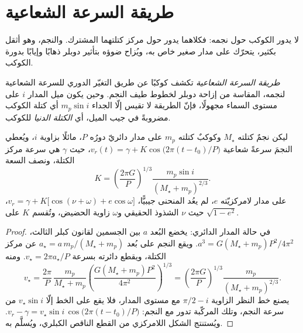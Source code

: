 \section{طريقة السرعة الشعاعية}\label{sec:b3:exoplanets:rv}

لا يدور الكوكب حول نجمه: فكلاهما يدور حول مركز كتلتهما المشترك.
والنجم، وهو أثقل بكثير، يتحرّك على مدار صغير خاص به، ويُزاح ضوؤه
بتأثير دوبلر ذهابًا وإيابًا بدورة الكوكب.

\begin{definition}\label{def:b3:exoplanets:rv}
\emph{طريقة السرعة الشعاعية} تكشف كوكبًا
عن طريق التغيّر الدوري للسرعة الشعاعية لنجمه،
المقاسة من إزاحة دوبلر لخطوط طيف النجم. وحين
يكون ميل المدار $i$ على مستوى السماء مجهولًا، فإنّ الطريقة
لا تقيس إلّا الجداء $m_p\sin i$ أي كتلة الكوكب مضروبةً في جيب
الميل، أي \emph{الكتلة الدنيا}
للكوكب.
\end{definition}

\begin{theorem}\label{thm:b3:exoplanets:semi-amplitude}
ليكن نجمٌ كتلته $M_\star$ وكوكبٌ كتلته $m_p$ على مدار دائريّ
دورُه $P$، مائلًا بزاوية $i$، ويُعطي النجمَ سرعةً شعاعية
$v_r(t) = \gamma + K\cos\bigl(2\pi(t - t_0)/P\bigr)$، حيث $\gamma$ هي
سرعة مركز الكتلة، ونصف السعة
\[
K = \left(\frac{2\pi G}{P}\right)^{1/3}
    \frac{m_p\sin i}{(M_\star + m_p)^{2/3}} .
\]
على مدار لامركزيّته $e$، لم يعُد المنحنى جيبيًّا،
$v_r = \gamma + K\bigl[\cos(\nu + \omega) + e\cos\omega\bigr]$، حيث $\nu$
الشذوذ الحقيقي و$\omega$ زاوية الحضيض، وتُقسم $K$
على $\sqrt{1 - e^2}$.
\end{theorem}

\begin{proof}
في حالة المدار الدائري: يخضع البُعد $a$ بين الجسمين
لقانون كبلر الثالث، $a^3 = G(M_\star + m_p)P^2/4\pi^2$. ويقع النجم على
بُعد $a_\star = a\,m_p/(M_\star + m_p)$ عن مركز الكتلة،
ويقطع دائرته بسرعة $v_\star = 2\pi a_\star/P$. ومنه
\[
v_\star = \frac{2\pi}{P}\,\frac{m_p}{M_\star + m_p}
          \left(\frac{G(M_\star + m_p)P^2}{4\pi^2}\right)^{1/3}
        = \left(\frac{2\pi G}{P}\right)^{1/3}\frac{m_p}{(M_\star + m_p)^{2/3}} .
\]
يصنع خط النظر الزاوية $\pi/2 - i$ مع مستوى
المدار، فلا يقع على الخط إلّا $v_\star\sin i$ من سرعة النجم،
وتلك المركّبة تدور مع النجم: $v_r - \gamma = v_\star\sin i\,
\cos\bigl(2\pi(t - t_0)/P\bigr)$. ويُستنتج الشكل اللامركزي من
القطع الناقص الكبلري، ويُسلَّم به.
\end{proof}

